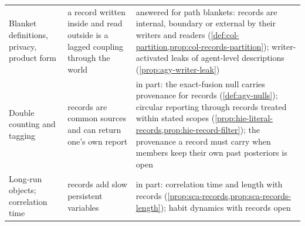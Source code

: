 \begin{table}[tp]
\begin{tabular}{@{}>{\raggedright\arraybackslash}p{}>{\raggedright\arraybackslash}p{}>{\raggedright\arraybackslash}p{}@{}}
Blanket definitions, privacy, product form & a record written inside and read outside is a lagged coupling through the world & answered for path blankets: records are internal, boundary or external by their writers and readers (\cref{def:col-partition,prop:col-records-partition}); writer-activated leaks of agent-level descriptions (\cref{prop:agy-writer-leak}) \\
Double counting and tagging & records are common sources and can return one's own report & in part: the exact-fusion null carries provenance for records (\cref{def:agy-nulls}); circular reporting through records treated within stated scopes (\cref{prop:hie-literal-records,prop:hie-record-filter}); the provenance a record must carry when members keep their own past posteriors is open \\
Long-run objects; correlation time & records add slow persistent variables & in part: correlation time and length with records (\cref{prop:sca-records,prop:sca-records-length}); habit dynamics with records open \\
\bottomrule
\end{tabular}
\end{table}

